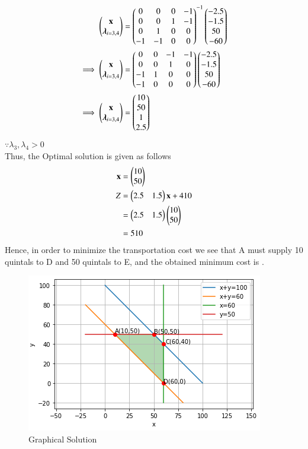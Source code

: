 \documentclass[journal,12pt,twocolumn]{IEEEtran}
\begin{document}
\begin{align}
    \begin{pmatrix}\mathbf{x} \\ \boldsymbol{\lambda}_{i=3,4}\end{pmatrix} &= \begin{pmatrix}0 & 0 & 0 & -1 \\ 0 & 0 & 1 & -1 \\ 0 & 1 & 0 & 0 \\ -1 & -1 & 0 & 0\end{pmatrix}^{-1}\begin{pmatrix}-2.5 \\ -1.5 \\ 50 \\ -60\end{pmatrix}
    \\
    \implies   \begin{pmatrix}\mathbf{x} \\ \boldsymbol{\lambda}_{i=3,4}\end{pmatrix} &= \begin{pmatrix}0 & 0 & -1 & -1 \\ 0 & 0 & 1 & 0 \\ -1 & 1 & 0 & 0 \\ -1 & 0 & 0 & 0\end{pmatrix}\begin{pmatrix}-2.5 \\ -1.5 \\ 50 \\ -60\end{pmatrix}
    \\
    \implies \begin{pmatrix}\mathbf{x} \\ \boldsymbol{\lambda}_{i=3,4}\end{pmatrix} &= \begin{pmatrix}10 \\ 50 \\ 1 \\ 2.5\end{pmatrix}
\end{align}
$\because \lambda_3,\lambda_4 > 0 $
\\
Thus, the Optimal solution is given as follows
\begin{align}
    \mathbf{x} &= \begin{pmatrix}10\\50\end{pmatrix} \\
    Z &= \begin{pmatrix}2.5 & 1.5\end{pmatrix}\mathbf{x} + 410 \\
    &= \begin{pmatrix}2.5 & 1.5\end{pmatrix}\begin{pmatrix}10 \\ 50\end{pmatrix} \\
    &= 510
\end{align}
Hence, in order to minimize the transportation cost we see that A must supply 10 quintals to D and 50 quintals to E, and the obtained minimum cost is .
\begin{figure}[!ht]
\centering
\includegraphics[width=\columnwidth]{graphical solution.PNG}
\caption{Graphical Solution}
\label{fig:Graphical Solution}	
\end{figure}
\end{document}
